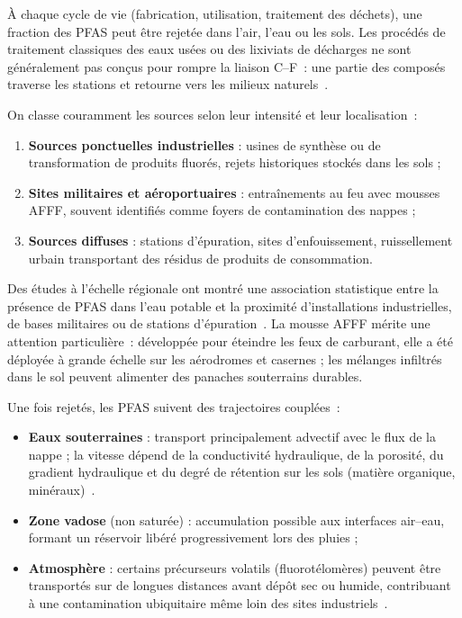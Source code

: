 \`A chaque cycle de vie (fabrication, utilisation, traitement des d\'echets), une fraction des PFAS peut \^etre rejet\'ee dans l'air, l'eau ou les sols.
Les proc\'ed\'es de traitement classiques des eaux us\'ees ou des lixiviats de d\'echarges ne sont g\'en\'eralement pas con\c{c}us pour rompre la liaison C--F~: une partie des compos\'es traverse les stations et retourne vers les milieux naturels~\cite{hu2016pfas,prevedouros2006pfas}.



On classe couramment les sources selon leur intensit\'e et leur localisation~:
\begin{enumerate}
    \item \textbf{Sources ponctuelles industrielles} : usines de synth\`ese ou de transformation de produits fluor\'es, rejets historiques stock\'es dans les sols ;
    \item \textbf{Sites militaires et a\'eroportuaires} : entra\^inements au feu avec mousses AFFF, souvent identifi\'es comme foyers de contamination des nappes ;
    \item \textbf{Sources diffuses} : stations d'\'epuration, sites d'enfouissement, ruissellement urbain transportant des r\'esidus de produits de consommation.
\end{enumerate}

Des \'etudes \`a l'\'echelle r\'egionale ont montr\'e une association statistique entre la pr\'esence de PFAS dans l'eau potable et la proximit\'e d'installations industrielles, de bases militaires ou de stations d'\'epuration~\cite{hu2016pfas}.
La mousse AFFF m\'erite une attention particuli\`ere~: d\'evelopp\'ee pour \'eteindre les feux de carburant, elle a \'et\'e d\'eploy\'ee \`a grande \'echelle sur les a\'erodromes et casernes ; les m\'elanges infiltr\'es dans le sol peuvent alimenter des panaches souterrains durables.



Une fois rejet\'es, les PFAS suivent des trajectoires coupl\'ees~:
\begin{itemize}
    \item \textbf{Eaux souterraines} : transport principalement advectif avec le flux de la nappe ; la vitesse d\'epend de la conductivit\'e hydraulique, de la porosit\'e, du gradient hydraulique et du degr\'e de r\'etention sur les sols (mati\`ere organique, min\'eraux)~\cite{brusseau2019pfas}.
    \item \textbf{Zone vadose} (non satur\'ee) : accumulation possible aux interfaces air--eau, formant un r\'eservoir lib\'er\'e progressivement lors des pluies ;
    \item \textbf{Atmosph\`ere} : certains pr\'ecurseurs volatils (fluorot\'elom\`eres) peuvent \^etre transport\'es sur de longues distances avant d\'ep\^ot sec ou humide, contribuant \`a une contamination ubiquitaire m\^eme loin des sites industriels~\cite{guelfo2021pfas}.
\end{itemize}

